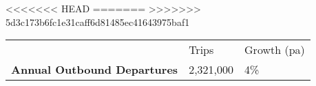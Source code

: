 <<<<<<< HEAD
=======
>>>>>>> 5d3c173b6fc1e31caff6d81485ec41643975baf1
\begin{tabular}[t]{p{4.7cm}>{\hfill}p{1.1cm}>{\hfill}p{1.7cm}}
   & Trips & Growth (pa) \\ 
 \textbf{Annual Outbound Departures} & 2,321,000 & 4\% \\ 
  \end{tabular}
